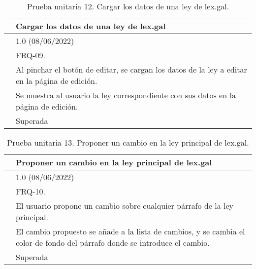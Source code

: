 \begin{table}[H]
\begin{center}
\begin{tabular}{|p{3cm}|p{10cm}|} \hline
\centering {\bf PU-12} & Cargar los datos de una ley de lex.gal  \\ \hline\hline
\centering {\bf Versión} & 1.0 (08/06/2022) \\ \hline
\centering {\bf Dependencias} & FRQ-09. \\ \hline
\centering {\bf Descripción} &  Al pinchar el botón de editar, se cargan los datos de la ley a editar en la página de edición. \\ \hline
\centering {\bf Criterio de aceptación} & Se muestra al usuario la ley correspondiente con sus datos en la página de edición. \\ \hline
\centering {\bf Estado} & Superada \\ \hline
\end{tabular}
\caption{Prueba unitaria 12. Cargar los datos de una ley de lex.gal.}
\label{enlacePU12}
\end{center}
\end{table}

\begin{table}[H]
\begin{center}
\begin{tabular}{|p{3cm}|p{10cm}|} \hline
\centering {\bf PU-13} & Proponer un cambio en la ley principal de lex.gal  \\ \hline\hline
\centering {\bf Versión} & 1.0 (08/06/2022) \\ \hline
\centering {\bf Dependencias} & FRQ-10. \\ \hline
\centering {\bf Descripción} &  El usuario propone un cambio sobre cualquier párrafo de la ley principal. \\ \hline
\centering {\bf Criterio de aceptación} & El cambio propuesto se añade a la lista de cambios, y se cambia el color de fondo del párrafo donde se introduce el cambio. \\ \hline
\centering {\bf Estado} & Superada \\ \hline
\end{tabular}
\caption{Prueba unitaria 13. Proponer un cambio en la ley principal de lex.gal.}
\label{enlacePU13}
\end{center}
\end{table}

